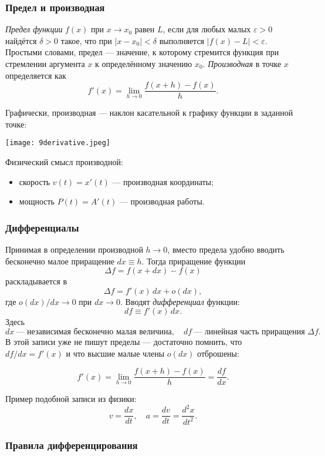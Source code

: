 \documentclass[12pt, a4paper]{article}%
\begin{document}
\subsubsection*{Предел и производная}
\emph{Предел функции} $f(x)$ при $x\to x_0$ равен $L$, если для любых малых $\varepsilon>0$ найдётся $\delta>0$ такое, что при $|x-x_0|<\delta$ выполняется $|f(x)-L|<\varepsilon$. Простыми словами, предел --- значение, к которому стремится функция при стремлении аргумента $x$ к определённому значению $x_0$. 
\emph{Производная} в точке $x$ определяется как
\[
f'(x)=\lim_{h\to0}\frac{f(x+h)-f(x)}{h}.
\]



Графически, производная --- наклон касательной к графику функции в заданной точке:

\begin{center}
\texttt{[image: 9derivative.jpeg]}
\label{fig:mpr}
\end{center}

Физический смысл производной:
\begin{itemize}
  \item скорость $v(t)=x'(t)$ — производная координаты;
  \item мощность $P(t)=A'(t)$ — производная работы.
\end{itemize}


\subsubsection*{Дифференциалы}
Принимая в определении производной $h\to0$, вместо предела удобно вводить бесконечно малое приращение $dx\equiv h$. Тогда приращение функции
\[
\Delta f = f(x+dx)-f(x)
\]
раскладывается в
\[
\Delta f = f'(x)\,dx + o(dx),
\]
где $o(dx)/dx\to0$ при $dx\to0$.  
Вводят \emph{дифференциал} функции:
\[
df \equiv f'(x)\,dx.
\]
Здесь 
\[
dx\ \text{— независимая бесконечно малая величина},\quad
df\ \text{— линейная часть приращения } \Delta f.
\]
В этой записи уже не пишут пределы — достаточно помнить, что $df/dx=f'(x)$ и что высшие малые члены $o(dx)$ отброшены:


\[
f'(x)=\lim_{h\to0}\frac{f(x+h)-f(x)}{h} = \frac{df}{dx}.
\]

Пример подобной записи из физики:  
\[
v = \frac{dx}{dt},\quad
a = \frac{dv}{dt} = \frac{d^2x}{dt^2}.
\]


\subsubsection*{Правила дифференцирования}
\end{document}
